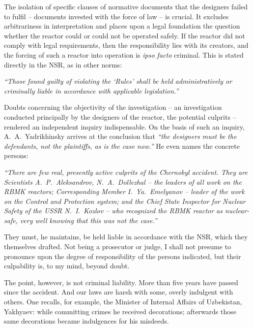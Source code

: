 \documentclass[openright]{bookest}
\begin{document}

The isolation of specific clauses of normative documents that the designers failed to fulfil -- documents invested with the force of law -- is crucial. It excludes arbitrariness in interpretation and places upon a legal foundation the question whether the reactor could or could not be operated safely. If the reactor did not comply with legal requirements, then the responsibility lies with its creators, and the forcing of such a reactor into operation is \textit{ipso facto} criminal. This is stated directly in the NSR, as in other norms:

\begin{personal}
\textit{``Those found guilty of violating the `Rules' shall be held administratively or criminally liable in accordance with applicable legislation.''}
\end{personal}

Doubts concerning the objectivity of the investigation -- an investigation conducted principally by the designers of the reactor, the potential culprits -- rendered an independent inquiry indispensable. On the basis of such an inquiry, A.~A.~Yadrikhinsky arrives at the conclusion that \textit{``the designers must be the defendants, not the plaintiffs, as is the case now.''} He even names the concrete persons:

\begin{personal}
\textit{``There are few real, presently active culprits of the Chernobyl accident. They are Scientists A.~P.~Aleksandrov, N.~A.~Dollezhal -- the leaders of all work on the RBMK reactors; Corresponding Member I.~Ya.~Emelyanov -- leader of the work on the Control and Protection system; and the Chief State Inspector for Nuclear Safety of the USSR N.~I.~Kozlov -- who recognized the RBMK reactor as nuclear-safe, very well knowing that this was not the case.''}
\end{personal}

They must, he maintains, be held liable in accordance with the NSR, which they themselves drafted. Not being a prosecutor or judge, I shall not presume to pronounce upon the degree of responsibility of the persons indicated, but their culpability is, to my mind, beyond doubt.


The point, however, is not criminal liability. More than five years have passed since the accident. And our laws are harsh with some, overly indulgent with others. One recalls, for example, the Minister of Internal Affairs of Uzbekistan, Yakhyaev: while committing crimes he received decorations; afterwards those same decorations became indulgences for his misdeeds.
\end{document}
